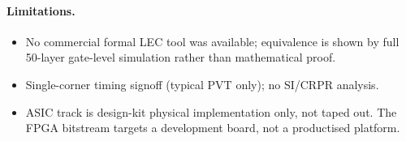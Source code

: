 \paragraph{Limitations.}
\begin{itemize}[nosep]
\item No commercial formal LEC tool was available; equivalence is shown by full 50-layer gate-level simulation rather than mathematical proof.
\item Single-corner timing signoff (typical PVT only); no SI/CRPR analysis.
\item ASIC track is design-kit physical implementation only, not taped out. The FPGA bitstream targets a development board, not a productised platform.
\end{itemize}
